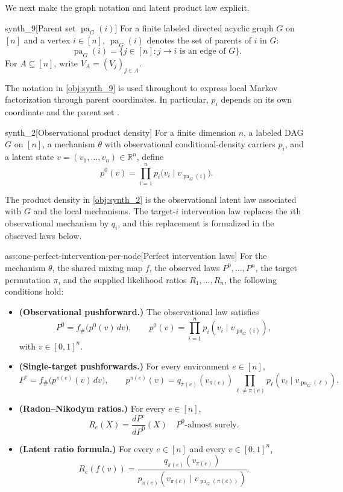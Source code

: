 We next make the graph notation and latent product law explicit.

\begin{definitionv}{synth_9}[Parent set \(\operatorname{pa}_G(i)\)]
For a finite labeled directed acyclic graph \(G\) on \([n]\) and a vertex \(i\in[n]\), \(\operatorname{pa}_G(i)\) denotes the set of parents of \(i\) in \(G\):
\[
\operatorname{pa}_G(i)=\{j\in[n]: j\to i \text{ is an edge of }G\}.
\]
For \(A\subseteq[n]\), write \(V_A=(V_j)_{j\in A}\).
\end{definitionv}

The notation in \cref{obj:synth_9} is used throughout to express local Markov factorization through parent coordinates. In particular, \(p_i\) depends on its own coordinate and the parent set .

\begin{definitionv}{synth_2}[Observational product density]
For a finite dimension \(n\), a labeled DAG \(G\) on \([n]\), a mechanism \(\theta\) with observational conditional-density carriers \(p_i\), and a latent state \(v=(v_1,\ldots,v_n)\in\mathbb R^n\), define
\[
p^0(v)=\prod_{i=1}^n p_i\bigl(v_i\mid v_{\operatorname{pa}_G(i)}\bigr).
\]
\end{definitionv}

The product density  in \cref{obj:synth_2} is the observational latent law associated with \(G\) and the local mechanisms. The target-\(i\) intervention law  replaces the \(i\)th observational mechanism by \(q_i\), and this replacement is formalized in the observed laws below.

\begin{assumptionv}{ass:one-perfect-intervention-per-node}[Perfect intervention laws]
For the mechanism \(\theta\), the shared mixing map \(f\), the observed laws \(P^0,\ldots,P^n\), the target permutation \(\pi\), and the supplied likelihood ratios \(R_1,\ldots,R_n\), the following conditions hold:
\begin{itemize}
\item \textbf{(Observational pushforward.)} The observational law satisfies
\[
P^0
=
f_\#\bigl(p^0(v)\,dv\bigr),
\qquad
p^0(v)=\prod_{i=1}^n p_i(v_i\mid v_{\operatorname{pa}_G(i)}),
\]
with \(v\in[0,1]^n\).
\item \textbf{(Single-target pushforwards.)} For every environment \(e\in[n]\),
\[
P^e
=
f_\#\bigl(p^{\pi(e)}(v)\,dv\bigr),
\qquad
p^{\pi(e)}(v)
=
q_{\pi(e)}(v_{\pi(e)})
\prod_{\ell\ne \pi(e)}
p_\ell(v_\ell\mid v_{\operatorname{pa}_G(\ell)}).
\]
\item \textbf{(Radon--Nikodym ratios.)} For every \(e\in[n]\),
\[
R_e(X)=\frac{dP^e}{dP^0}(X)
\quad\text{\(P^0\)-almost surely.}
\]
\item \textbf{(Latent ratio formula.)} For every \(e\in[n]\) and every \(v\in[0,1]^n\),
\[
R_e(f(v))
=
\frac{q_{\pi(e)}(v_{\pi(e)})}
{p_{\pi(e)}(v_{\pi(e)}\mid v_{\operatorname{pa}_G(\pi(e))})}.
\]
\end{itemize}
\end{assumptionv}

